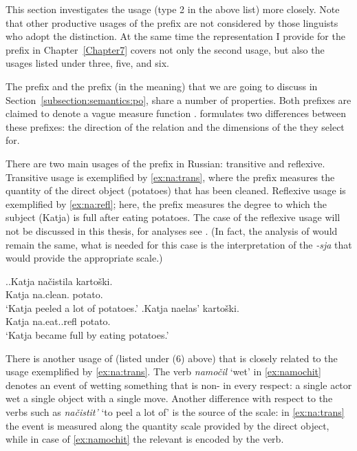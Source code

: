 This section investigates the  usage (type 2 in the above list) more closely. Note that other productive usages of the prefix  are not considered  by those linguists who adopt the distinction. At the same time the representation I provide for the prefix  in Chapter~\ref{Chapter7} covers not only the second usage, but also the usages listed under three, five, and six.

The  prefix  and the prefix  (in the  meaning) that we are going to discuss in Section~\ref{subsection:semantics:po}, share a number of properties. Both prefixes are claimed to denote a vague measure function \citep{Filip:00, Souchkova:04}. \citet{Souchkova:04} formulates two differences between these prefixes: the direction of the relation and the dimensions of the  they select for.

There are two main usages of the  prefix  in Russian: transitive and reflexive. Transitive usage is exemplified by \ref{ex:na:trans}, where the prefix measures the quantity of the direct object (potatoes) that has been cleaned. Reflexive usage is exemplified by \ref{ex:na:refl}; here, the prefix  measures the degree to which the subject (Katja) is full after eating potatoes. The case of the reflexive usage will not be discussed in this thesis, for analyses see \citet{KaganPereltsvaig:11a,KaganPereltsvaig:11b,Souchkova:04,Filip:00,Filip:05}. (In fact, the analysis of  would remain the same, what is needed for this case is the interpretation of the  \textit{-sja} that would provide the appropriate scale.)

\ex.\ag.\label{ex:na:trans}Katja na\v{c}istila karto\v{s}ki.\\
Katja na.clean. potato.\\
\trans `Katja peeled a lot of potatoes.'
\bg.\label{ex:na:refl}Katja naelas' karto\v{s}ki.\\
Katja na.eat..refl potato.\\
\trans `Katja became full by eating potatoes.'

There is another usage of  (listed under (6) above) that is closely related to the  usage exemplified by \ref{ex:na:trans}. The verb \textit{namo\v{c}il} `wet' in \ref{ex:namochit} denotes an event of wetting something that is non- in every respect: a single actor wet a single object with a single move. Another difference with respect to the verbs such as \textit{na\v{c}istit'} `to peel a lot of' is the source of the scale: in \ref{ex:na:trans} the event is measured along the quantity scale provided by the direct object, while in case of \ref{ex:namochit} the relevant  is encoded by the verb.


